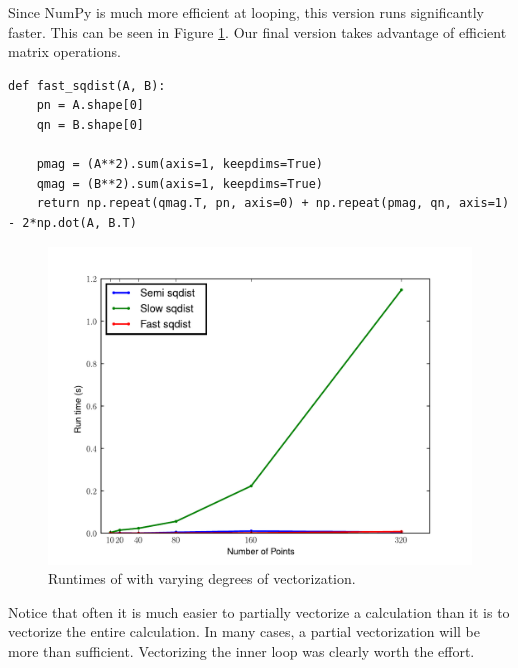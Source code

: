 Since NumPy is much more efficient at looping, this version runs significantly faster.  This can be seen in Figure \ref{fig:sqplot}.
Our final version takes advantage of efficient matrix operations.
\begin{lstlisting}
def fast_sqdist(A, B):
    pn = A.shape[0]
    qn = B.shape[0]

    pmag = (A**2).sum(axis=1, keepdims=True)
    qmag = (B**2).sum(axis=1, keepdims=True)
    return np.repeat(qmag.T, pn, axis=0) + np.repeat(pmag, qn, axis=1) - 2*np.dot(A, B.T)
\end{lstlisting}

\begin{figure}[h]
\centering
\includegraphics[width=\textwidth]{sqplot.pdf}
\caption{Runtimes of  with varying degrees of vectorization.}
\label{fig:sqplot}
\end{figure}

Notice that often it is much easier to partially vectorize a calculation than it is to vectorize the entire calculation.
In many cases, a partial vectorization will be more than sufficient.  Vectorizing the inner loop was clearly worth the effort.

